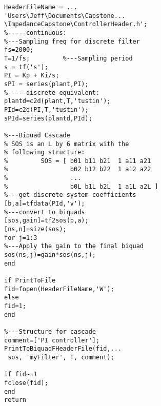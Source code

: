 \begin{enumerate}
\begin{verbatim}
HeaderFileName = ...
'Users\Jeff\Documents\Capstone...
\ImpedanceCapstone\ControllerHeader.h';
%-----continuous:
%---Sampling freq for discrete filter
fs=2000;        
T=1/fs;         %---Sampling period
s = tf('s');
PI = Kp + Ki/s;
sPI = series(plant,PI);
%-----discrete equivalent:
plantd=c2d(plant,T,'tustin');
PId=c2d(PI,T,'tustin');
sPId=series(plantd,PId);

%---Biquad Cascade
% SOS is an L by 6 matrix with the 
% following structure:
%         SOS = [ b01 b11 b21  1 a11 a21  
%                 b02 b12 b22  1 a12 a22
%                 ...
%                 b0L b1L b2L  1 a1L a2L ]
%---get discrete system coefficients
[b,a]=tfdata(PId,'v');      
%---convert to biquads 
[sos,gain]=tf2sos(b,a);     
[ns,n]=size(sos);
for j=1:3                   
%---Apply the gain to the final biquad
sos(ns,j)=gain*sos(ns,j);
end

if PrintToFile
fid=fopen(HeaderFileName,'W');    
else
fid=1;   
end

%---Structure for cascade
comment=['PI controller'];
PrintToBiquadFHeaderFile(fid,...
 sos, 'myFilter', T, comment);

if fid~=1
fclose(fid);
end 
return
\end{verbatim}
\end{enumerate}